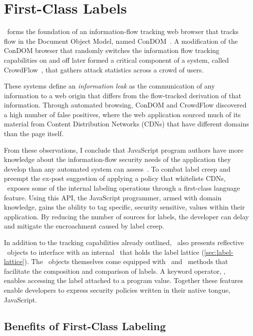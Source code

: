 
\chapter{First-Class Labels}
\label{ch:first-class-labels}

\FlowCore\ forms the foundation of an information-flow tracking web browser that tracks flow in the Document Object Model, named ConDOM~\cite{kerschbaumer.etal+12}.
A modification of the ConDOM browser that randomly switches the information flow tracking capabilities on and off later formed a critical component of a system, called CrowdFlow~\cite{kerschbaumer.etal+13}, that gathers attack statistics across a crowd of users.

These systems define an \emph{information leak} as the communication of any information to a web origin that differs from the flow-tracked derivation of that information.
Through automated browsing, ConDOM and CrowdFlow discovered a high number of false positives, where the web application sourced much of its material from Content Distribution Networks (CDNs) that have different domains than the page itself.

From these observations, I conclude that JavaScript program authors have more knowledge about the information-flow security needs of the application they develop than any automated system can assess~\cite{hennigan.etal+12, hennigan.etal+13}.
To combat label creep and preempt the ex-post suggestion of applying a policy that whitelists CDNs, \FlowCore\ exposes some of the internal labeling operations through a first-class language feature.
Using this API, the JavaScript programmer, armed with domain knowledge, gains the ability to tag specific, security sensitive, values within their application.
By reducing the number of sources for labels, the developer can delay and mitigate the encroachment caused by label creep.

In addition to the tracking capabilities already outlined, \FlowCore\ also presents reflective \FlowLabel\ objects to interface with an internal \FlowLabelRegistry\ that holds the label lattice (\autoref{sec:label-lattice}).
The \FlowLabel\ objects themselves come equipped with \mjoin\ and \msubsumes\ methods that facilitate the composition and comparison of labels.
A keyword operator, \mlabelof, enables accessing the label attached to a program value.
Together these features enable developers to express security policies written in their native tongue, JavaScript.

\section{Benefits of First-Class Labeling}

